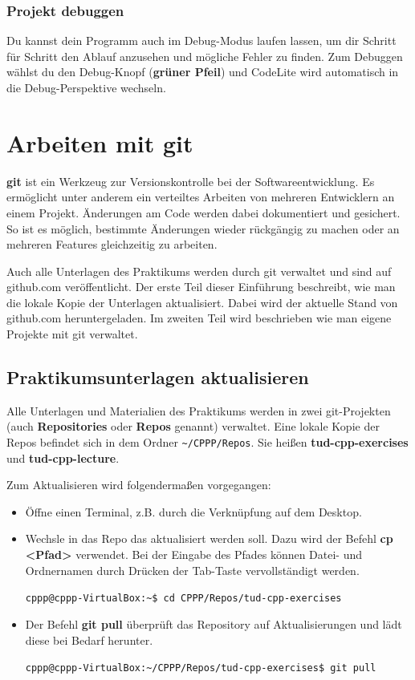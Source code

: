 \documentclass[
  accentcolor=tud1c,	%
  colorbacktitle,		%
  inverttitle,			%
  german,
  twoside
]{tudreport}
\begin{document}
\subsection{Projekt debuggen}
Du kannst dein Programm auch im Debug-Modus laufen lassen, um dir Schritt für Schritt den Ablauf anzusehen und mögliche Fehler zu finden.
Zum Debuggen wählst du den Debug-Knopf (\textbf{grüner Pfeil}) und CodeLite wird automatisch in die Debug-Perspektive wechseln. 

\chapter{Arbeiten mit git}

\textbf{git} ist ein Werkzeug zur Versionskontrolle bei der Softwareentwicklung. Es ermöglicht unter anderem ein verteiltes Arbeiten von mehreren Entwicklern an einem Projekt. Änderungen am Code werden dabei dokumentiert und gesichert. So ist es möglich, bestimmte Änderungen wieder rückgängig zu machen oder an mehreren Features gleichzeitig zu arbeiten.

Auch alle Unterlagen des Praktikums werden durch git verwaltet und sind auf github.com veröffentlicht. Der erste Teil dieser Einführung beschreibt, wie man die lokale Kopie der Unterlagen aktualisiert. Dabei wird der aktuelle Stand von github.com heruntergeladen. Im zweiten Teil wird beschrieben wie man eigene Projekte mit git verwaltet.

\section{Praktikumsunterlagen aktualisieren}
Alle Unterlagen und Materialien des Praktikums werden in zwei git-Projekten (auch \textbf{Repositories} oder \textbf{Repos} genannt) verwaltet. Eine lokale Kopie der Repos befindet sich in dem Ordner \texttt{\textasciitilde/CPPP/Repos}. Sie heißen \textbf{tud-cpp-exercises} und \textbf{tud-cpp-lecture}.

Zum Aktualisieren wird folgendermaßen vorgegangen:

\begin{itemize}
\item Öffne einen Terminal, z.B. durch die Verknüpfung auf dem Desktop.
\item Wechsle in das Repo das aktualisiert werden soll. Dazu wird der Befehl \textbf{cp <Pfad>} verwendet. Bei der Eingabe des Pfades können Datei- und Ordnernamen durch Drücken der Tab-Taste vervollständigt werden.

\texttt{cppp@cppp-VirtualBox:\textasciitilde\$ cd CPPP/Repos/tud-cpp-exercises}

\item Der Befehl \textbf{git pull} überprüft das Repository auf Aktualisierungen und lädt diese bei Bedarf herunter.

\texttt{cppp@cppp-VirtualBox:\textasciitilde/CPPP/Repos/tud-cpp-exercises\$ git pull}
\end{itemize}
\end{document}
